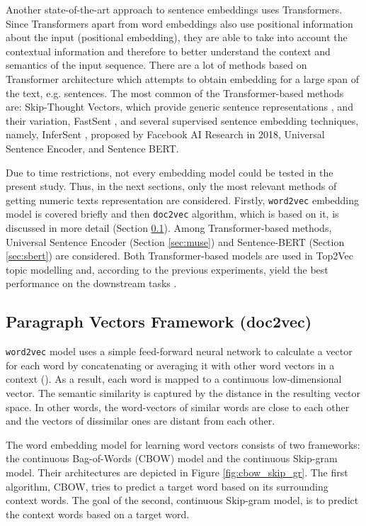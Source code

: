 \documentclass[fontsize=12pt,a4paper,twoside,openany]{scrbook}
\begin{document}
Another state-of-the-art approach to sentence embeddings uses Transformers. Since Transformers apart from word embeddings also use positional information about the input (positional embedding), they are able to take into account the contextual information and therefore to better understand the context and semantics of the input sequence. There are a lot of methods based on Transformer architecture which attempts to obtain embedding for a large span of the text, e.g. sentences. The most common of the Transformer-based methods are: Skip-Thought Vectors, which provide generic sentence representations \parencite{Kiros15}, and their variation, FastSent \parencite{Hill16}, and several supervised sentence embedding techniques, namely, InferSent \parencite{Conneau17}, proposed by Facebook AI Research in 2018, Universal Sentence Encoder, and Sentence BERT. 

Due to time restrictions, not every embedding model could be tested in the present study. Thus, in the next sections, only the most relevant methods of getting numeric texts representation are considered. Firstly, \verb|word2vec| embedding model is covered briefly and then \verb|doc2vec| algorithm, which is based on it, is discussed in more detail (Section \ref{sec:doc2vec}). Among Transformer-based methods, Universal Sentence Encoder (Section \ref{sec:muse}) and Sentence-BERT (Section \ref{sec:sbert}) are considered. Both Transformer-based models are used in Top2Vec topic modelling and, according to the previous experiments, yield the best performance on the downstream tasks \parencite{Wang20}.

\subsection{Paragraph Vectors Framework (doc2vec)}
\label{sec:doc2vec}

\verb|word2vec| model uses a simple feed-forward neural network to calculate a vector for each word by concatenating or averaging it with other word vectors in a context (). As a result, each word is mapped to a continuous low-dimensional vector. The semantic similarity is captured by the distance in the resulting vector space. In other words, the word-vectors of similar words are close to each other and the vectors of dissimilar ones are distant from each other.

The word embedding model for learning word vectors consists of two frameworks: the continuous Bag-of-Words (CBOW) model and the continuous Skip-gram model. Their architectures are depicted in Figure \ref{fig:cbow_skip_gr}. The first algorithm, CBOW, tries to predict a target word based on its surrounding context words. The goal of the second, continuous Skip-gram model, is to predict the context words based on a target word.
\end{document}
